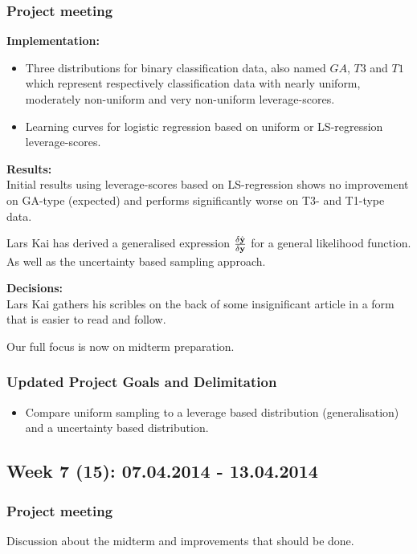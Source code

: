 \subsubsection*{Project meeting}

\textbf{Implementation:}\\
\begin{itemize}
\item Three distributions for binary classification data, also named $GA$, $T3$ and $T1$ which represent respectively classification data with nearly uniform, moderately non-uniform and very non-uniform leverage-scores.
\item Learning curves for logistic regression based on uniform or LS-regression leverage-scores.
\end{itemize}

\textbf{Results:}\\
Initial results using leverage-scores based on LS-regression shows no improvement on GA-type (expected) and performs significantly worse on T3- and T1-type data.

Lars Kai has derived a generalised expression $\frac{\delta \hat{{\bf y}}}{\delta {\bf y}}$ for a general likelihood function. As well as the uncertainty based sampling approach.

\textbf{Decisions:}\\
Lars Kai gathers his scribles on the back of some insignificant article in a form that is easier to read and follow.

Our full focus is now on midterm preparation.

\subsubsection*{Updated Project Goals and Delimitation}
\begin{itemize}
\item Compare uniform sampling to a leverage based distribution (generalisation) and a uncertainty based distribution.
\end{itemize}

\subsection*{Week 7 (15): 07.04.2014 - 13.04.2014}
\subsubsection*{Project meeting}
Discussion about the midterm and improvements that should be done.

